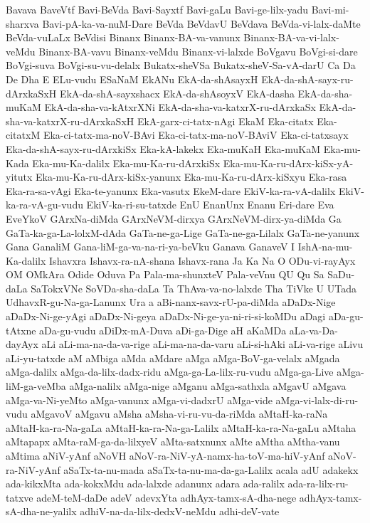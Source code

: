 {Bavava
BaveVtf
Bavi-BeVda
Bavi-Sayxtf
Bavi-gaLu
Bavi-ge-lilx-yadu
Bavi-mi-sharxva
Bavi-pA-ka-va-nuM-Dare
BeVda
BeVdavU
BeVdava
BeVda-vi-lalx-daMte
BeVda-vuLaLx
BeVdisi
Binanx
Binanx-BA-va-vanunx
Binanx-BA-va-vi-lalx-veMdu
Binanx-BA-vavu
Binanx-veMdu
Binanx-vi-lalxde
BoVgavu
BoVgi-si-dare
BoVgi-suva
BoVgi-su-vu-delalx
Bukatx-sheVSa
Bukatx-sheV-Sa-vA-darU
Ca
Da
De
Dha
E
ELu-vudu
ESaNaM
EkANu
EkA-da-shAsayxH
EkA-da-shA-sayx-ru-dArxkaSxH
EkA-da-shA-sayxshacx
EkA-da-shAsoyxV
EkA-dasha
EkA-da-sha-muKaM
EkA-da-sha-va-kAtxrXNi
EkA-da-sha-va-katxrX-ru-dArxkaSx
EkA-da-sha-va-katxrX-ru-dArxkaSxH
EkA-garx-ci-tatx-nAgi
EkaM
Eka-citatx
Eka-citatxM
Eka-ci-tatx-ma-noV-BAvi
Eka-ci-tatx-ma-noV-BAviV
Eka-ci-tatxsayx
Eka-da-shA-sayx-ru-dArxkiSx
Eka-kA-lakekx
Eka-muKaH
Eka-muKaM
Eka-mu-Kada
Eka-mu-Ka-dalilx
Eka-mu-Ka-ru-dArxkiSx
Eka-mu-Ka-ru-dArx-kiSx-yA-yitutx
Eka-mu-Ka-ru-dArx-kiSx-yanunx
Eka-mu-Ka-ru-dArx-kiSxyu
Eka-rasa
Eka-ra-sa-vAgi
Eka-te-yanunx
Eka-vasutx
EkeM-dare
EkiV-ka-ra-vA-dalilx
EkiV-ka-ra-vA-gu-vudu
EkiV-ka-ri-su-tatxde
EnU
EnanUnx
Enanu
Eri-dare
Eva
EveYkoV
GArxNa-diMda
GArxNeVM-dirxya
GArxNeVM-dirx-ya-diMda
Ga
GaTa-ka-ga-La-lolxM-dAda
GaTa-ne-ga-Lige
GaTa-ne-ga-Lilalx
GaTa-ne-yanunx
Gana
GanaliM
Gana-liM-ga-va-na-ri-ya-beVku
Ganava
GanaveV
I
IshA-na-mu-Ka-dalilx
Ishavxra
Ishavx-ra-nA-shana
Ishavx-rana
Ja
Ka
Na
O
ODu-vi-rayAyx
OM
OMkAra
Odide
Oduva
Pa
Pala-ma-shunxteV
Pala-veVnu
QU
Qu
Sa
SaDu-daLa
SaTokxVNe
SoVDa-sha-daLa
Ta
ThAva-va-no-lalxde
Tha
TiVke
U
UTada
UdhavxR-gu-Na-ga-Lanunx
Ura
a
aBi-nanx-savx-rU-pa-diMda
aDaDx-Nige
aDaDx-Ni-ge-yAgi
aDaDx-Ni-geya
aDaDx-Ni-ge-ya-ni-ri-si-koMDu
aDagi
aDa-gu-tAtxne
aDa-gu-vudu
aDiDx-mA-Duva
aDi-ga-Dige
aH
aKaMDa
aLa-va-Da-dayAyx
aLi
aLi-ma-na-da-va-rige
aLi-ma-na-da-varu
aLi-si-hAki
aLi-va-rige
aLivu
aLi-yu-tatxde
aM
aMbiga
aMda
aMdare
aMga
aMga-BoV-ga-velalx
aMgada
aMga-dalilx
aMga-da-lilx-dadx-ridu
aMga-ga-La-lilx-ru-vudu
aMga-ga-Live
aMga-liM-ga-veMba
aMga-nalilx
aMga-nige
aMganu
aMga-sathxla
aMgavU
aMgava
aMga-va-Ni-yeMto
aMga-vanunx
aMga-vi-dadxrU
aMga-vide
aMga-vi-lalx-di-ru-vudu
aMgavoV
aMgavu
aMsha
aMsha-vi-ru-vu-da-riMda
aMtaH-ka-raNa
aMtaH-ka-ra-Na-gaLa
aMtaH-ka-ra-Na-ga-Lalilx
aMtaH-ka-ra-Na-gaLu
aMtaha
aMtapapx
aMta-raM-ga-da-lilxyeV
aMta-satxnunx
aMte
aMtha
aMtha-vanu
aMtima
aNiV-yAnf
aNoVH
aNoV-ra-NiV-yA-namx-ha-toV-ma-hiV-yAnf
aNoV-ra-NiV-yAnf
aSaTx-ta-nu-mada
aSaTx-ta-nu-ma-da-ga-Lalilx
acala
adU
adakekx
ada-kikxMta
ada-kokxMdu
ada-lalxde
adanunx
adara
ada-ralilx
ada-ra-lilx-ru-tatxve
adeM-teM-daDe
adeV
adevxYta
adhAyx-tamx-sA-dha-nege
adhAyx-tamx-sA-dha-ne-yalilx
adhiV-na-da-lilx-dedxV-neMdu
adhi-deV-vate
}

